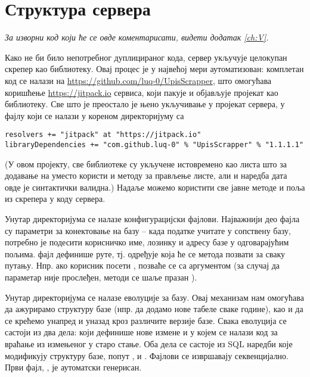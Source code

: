 \section{Структура сервера}
\vspace*{-7mm}
\emph{За изворни код који ће се овде коментарисати, видети додатак \ref{ch:V}.}

Како не би било непотребног дуплицираног кода, сервер укључује целокупан скрепер као библиотеку. Овај процес је у највећој мери аутоматизован: комплетан код се налази на \url{https://github.com/luq-0/UpisScrapper}, што омогућава коришћење \url{https://jitpack.io} сервиса, који пакује и објављује пројекат као библиотеку. Све што је преостало је њено укључивање у пројекат сервера, у фајлу  који се налази у кореном директоријуму са 
\begin{verbatim}
resolvers += "jitpack" at "https://jitpack.io"
libraryDependencies += "com.github.luq-0" % "UpisScrapper" % "1.1.1.1"
\end{verbatim}
(У овом пројекту, све библиотеке су укључене истовремено као листа што за додавање на  уместо \code{++=} користи \code{+=} и  методу за прављење листе, али и наредба дата овде је синтактички валидна.) Надаље можемо користити све јавне методе и поља из скрепера у коду сервера.

Унутар  директоријума се налазе конфигурацијски фајлови. Најважнији део  фајла су параметри за конектовање на базу -- када податке учитате у сопствену базу, потребно је подесити корисничко име, лозинку и адресу базе у одговарајућим  пољима.  фајл дефинише руте, тј. одређује која ће се метода позвати за сваку путању. Нпр. ако корисник посети , позваће се  са аргументом  (за случај да  параметар није прослеђен, методи се шаље празан ).

Унутар  директоријума се налазе еволуције за  базу. Овај механизам нам омогућава да ажурирамо структуру базе (нпр. да додамо нове табеле сваке године), као и да се крећемо унапред и уназад кроз различите верзије базе. Свака еволуција се састоји из два дела:  који дефинише нове измене и  у којем се налази код за враћање из измењеног у старо стање. Оба дела се састоје из SQL наредби које модификују структуру базе, попут ,  и . Фајлови се извршавају секвенцијално. Први фајл, , је аутоматски генерисан.

